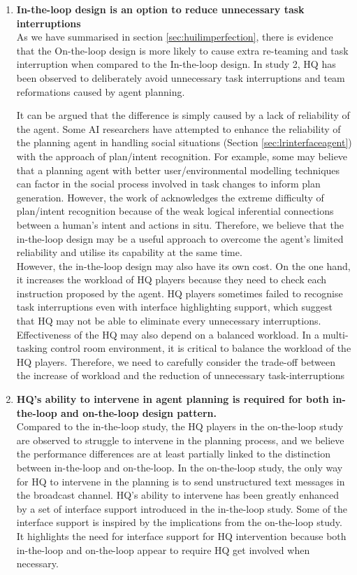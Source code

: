 \begin{enumerate}
\item \textbf{In-the-loop design is an option to reduce unnecessary task interruptions} \\
As we have summarised in section \ref{sec:huilimperfection}, there is evidence that the On-the-loop design is more likely to cause extra re-teaming and task interruption when compared to the In-the-loop design. In study 2, HQ has been observed to deliberately avoid unnecessary task interruptions and team reformations caused by agent planning. 

It can be argued that the difference is simply caused by a lack of reliability of the agent. Some AI researchers have attempted to enhance the reliability of the planning agent in handling social situations (Section \ref{sec:lrinterfaceagent}) with the approach of plan/intent recognition. For example, some may believe that a planning agent with better user/environmental modelling techniques can factor in the social process involved in task changes to inform plan generation. However, the work of \cite{Suchman1987} acknowledges the extreme difficulty of plan/intent recognition because of the weak logical inferential connections between a human's intent and actions in situ. Therefore, we believe that the in-the-loop design may be a useful approach to overcome the agent's limited reliability and utilise its capability at the same time.\\

However, the in-the-loop design may also have its own cost. On the one hand, it increases the workload of HQ players because they need to check each instruction proposed by the agent. HQ players sometimes failed to recognise task interruptions even with interface highlighting support, which suggest that HQ may not be able to eliminate every unnecessary interruptions. Effectiveness of the HQ may also depend on a balanced workload. In a multi-tasking control room environment, it is critical to balance the workload of the HQ players. Therefore, we need to carefully consider the trade-off between the increase of workload and the reduction of unnecessary task-interruptions \\

\item \textbf{HQ's ability to intervene in agent planning is required for both in-the-loop and on-the-loop design pattern.}\\
Compared to the in-the-loop study, the HQ players in the on-the-loop study are observed to struggle to intervene in the planning process, and we believe the performance differences are at least partially linked to the distinction between in-the-loop and on-the-loop. In the on-the-loop study, the only way for HQ to intervene in the planning is to send unstructured text messages in the broadcast channel. HQ's ability to intervene has been greatly enhanced by a set of interface support introduced in the in-the-loop study. Some of the interface support is inspired by the implications from the on-the-loop study. It highlights the need for interface support for HQ intervention because both in-the-loop and on-the-loop appear to require HQ get involved when necessary. \\


\end{enumerate}
